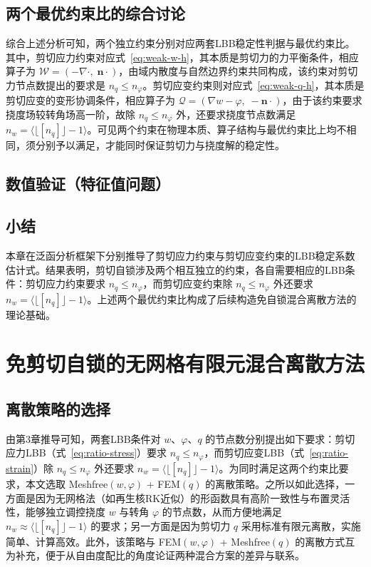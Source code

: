 \documentclass[internationalmaster]{hquThesis}
\begin{document}
\section{两个最优约束比的综合讨论}

综合上述分析可知，两个独立约束分别对应两套LBB稳定性判据与最优约束比。其中，剪切应力约束对应式~\eqref{eq:weak-w-h}，其本质是剪切力的力平衡条件，相应算子为 $\mathcal W=(-\nabla\cdot,\;\boldsymbol n\cdot)$，由域内散度与自然边界约束共同构成，该约束对剪切力节点数提出的要求是 $n_q\leq n_\varphi$。剪切应变约束则对应式~\eqref{eq:weak-q-h}，其本质是剪切应变的变形协调条件，相应算子为 $\mathcal Q=(\nabla w-\varphi,\;-\boldsymbol n\cdot)$，由于该约束要求挠度场较转角场高一阶，故除 $n_q\leq n_\varphi$ 外，还要求挠度节点数满足 $n_w=\bigl\langle\lfloor[n_q]\rfloor-1\bigr\rangle$。可见两个约束在物理本质、算子结构与最优约束比上均不相同，须分别予以满足，才能同时保证剪切力与挠度解的稳定性。

\section{数值验证（特征值问题）}

\section{小结}

本章在泛函分析框架下分别推导了剪切应力约束与剪切应变约束的LBB稳定系数估计式。结果表明，剪切自锁涉及两个相互独立的约束，各自需要相应的LBB条件：剪切应力约束要求 $n_q\leq n_\varphi$，而剪切应变约束除 $n_q\leq n_\varphi$ 外还要求 $n_w=\bigl\langle\lfloor[n_q]\rfloor-1\bigr\rangle$。上述两个最优约束比构成了后续构造免自锁混合离散方法的理论基础。

\chapter{免剪切自锁的无网格有限元混合离散方法}

\section{离散策略的选择}

由第3章推导可知，两套LBB条件对 $w$、$\varphi$、$q$ 的节点数分别提出如下要求：剪切应力LBB（式~\eqref{eq:ratio-stress}）要求 $n_q\leq n_\varphi$，而剪切应变LBB（式~\eqref{eq:ratio-strain}）除 $n_q\leq n_\varphi$ 外还要求 $n_w=\bigl\langle\lfloor[n_q]\rfloor-1\bigr\rangle$。为同时满足这两个约束比要求，本文选取 Meshfree$(w,\varphi)$ + FEM$(q)$ 的离散策略。之所以如此选择，一方面是因为无网格法（如再生核RK近似）的形函数具有高阶一致性与布置灵活性，能够独立调控挠度 $w$ 与转角 $\varphi$ 的节点数，从而方便地满足 $n_w\approx\bigl\langle\lfloor[n_q]\rfloor-1\bigr\rangle$ 的要求；另一方面是因为剪切力 $q$ 采用标准有限元离散，实施简单、计算高效。此外，该策略与 FEM$(w,\varphi)$ + Meshfree$(q)$ 的离散方式互为补充，便于从自由度配比的角度论证两种混合方案的差异与联系。
\end{document}
